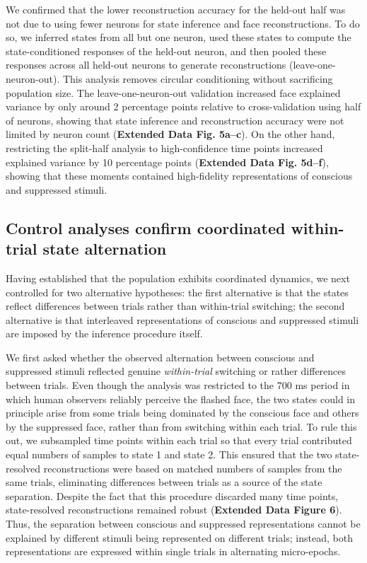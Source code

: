 \documentclass{article}
\begin{document}
We confirmed that the lower reconstruction accuracy for the held-out half was not due to using fewer neurons for state inference and face reconstructions. To do so, we inferred states from all but one neuron, used these states to compute the state-conditioned responses of the held-out neuron, and then pooled these responses across all held-out neurons to generate reconstructions (leave-one-neuron-out). This analysis removes circular conditioning without sacrificing population size. The leave-one-neuron-out validation increased face explained variance by only around 2 percentage points relative to cross-validation using half of neurons, showing that state inference and reconstruction accuracy were not limited by neuron count (\textbf{Extended Data Fig. 5a--c}). On the other hand, restricting the split-half analysis to high-confidence time points increased explained variance by 10 percentage points (\textbf{Extended Data Fig. 5d--f}), showing that these moments contained high-fidelity representations of conscious and suppressed stimuli.

\subsection*{Control analyses confirm coordinated within-trial state alternation}

Having established that the population exhibits coordinated dynamics, we next controlled for two alternative hypotheses: the first alternative is that the states reflect differences between trials rather than within-trial switching; the second alternative is that interleaved representations of conscious and suppressed stimuli are imposed by the inference procedure itself.

We first asked whether the observed alternation between conscious and suppressed stimuli reflected genuine \textit{within-trial} switching or rather differences between trials. Even though the analysis was restricted to the 700 ms period in which human observers reliably perceive the flashed face, the two states could in principle arise from some trials being dominated by the conscious face and others by the suppressed face, rather than from switching within each trial. To rule this out, we subsampled time points within each trial so that every trial contributed equal numbers of samples to state 1 and state 2. This ensured that the two state-resolved reconstructions were based on matched numbers of samples from the same trials, eliminating differences between trials as a source of the state separation. Despite the fact that this procedure discarded many time points, state-resolved reconstructions remained robust (\textbf{Extended Data Figure 6}). Thus, the separation between conscious and suppressed representations cannot be explained by different stimuli being represented on different trials; instead, both representations are expressed within single trials in alternating micro-epochs.
\end{document}
